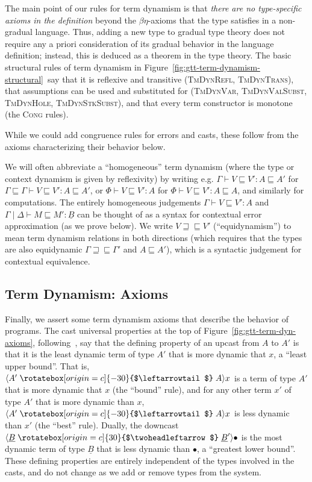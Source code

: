 \documentclass[acmsmall,screen,12pt]{acmart}
\newif\ifshort
\newif\iflong
\renewcommand{\u}{\underline}
\newcommand{\ltdyn}{\sqsubseteq}
\newcommand{\gtdyn}{\sqsupseteq}
\newcommand{\equidyn}{\mathrel{\gtdyn\ltdyn}}
\newcommand{\uarrow}{\mathrel{\rotatebox[origin=c]{-30}{$\leftarrowtail$}}}
\newcommand{\darrow}{\mathrel{\rotatebox[origin=c]{30}{$\twoheadleftarrow$}}}
\newcommand{\upcast}[2]{\langle{#2}\uarrow{#1}\rangle}
\newcommand{\dncast}[2]{\langle{#1}\darrow{#2}\rangle}
\begin{document}
The main point of our rules for term dynamism is that \emph{there are no
  type-specific axioms in the definition} beyond the $\beta\eta$-axioms
that the type satisfies in a non-gradual language.  Thus, adding a new
type to gradual type theory does not require any a priori consideration
of its gradual behavior in the language definition; instead, this is
deduced as a theorem in the type theory.  The basic structural rules of
term dynamism in Figure~\ref{fig:gtt-term-dynamism-structural}\iflong\ and Figure~\ref{fig:gtt-term-dynamism-ext-congruence}\fi\ say that
it is reflexive and transitive (\textsc{TmDynRefl},
\textsc{TmDynTrans}), that assumptions can be used and substituted for
(\textsc{TmDynVar}, \textsc{TmDynValSubst}, \textsc{TmDynHole},
\textsc{TmDynStkSubst}), and that every term constructor is monotone
(the \textsc{Cong} rules).
\begin{longonly}
While we could add congruence rules for errors and casts,
these follow from the axioms characterizing their behavior below.  
\end{longonly}

We will often abbreviate a ``homogeneous'' term dynamism (where the type
or context dynamism is given by reflexivity) by writing e.g. $\Gamma
\vdash V \ltdyn V' : A \ltdyn A'$ for $\Gamma \ltdyn \Gamma \vdash V
\ltdyn V' : A \ltdyn A'$, or $\Phi \vdash V \ltdyn V' : A$ for $\Phi
\vdash V \ltdyn V' : A \ltdyn A$, and similarly for computations.  The
entirely homogeneous judgements $\Gamma \vdash V \ltdyn V' : A$ and
$\Gamma \mid \Delta \vdash M \ltdyn M' : \u B$ can be thought of as a
syntax for contextual error approximation (as we prove below).  We write
$V \equidyn V'$ (``equidynamism'') to mean term dynamism relations in
both directions (which requires that the types are also equidynamic
$\Gamma \equidyn \Gamma'$ and $A \ltdyn A'$), which is a syntactic
judgement for contextual equivalence.

\ifshort \vspace{-0.1in} \fi
\subsection{Term Dynamism: Axioms}

Finally, we assert some term dynamism axioms that describe the behavior
of programs.  The cast universal properties at the top of
Figure~\ref{fig:gtt-term-dyn-axioms}, following~\citet{newlicata2018-fscd}, say that
the defining property of an upcast from $A$ to $A'$ is that it is the
least dynamic term of type $A'$ that is more dynamic that $x$, a ``least
upper bound''.  That is, $\upcast{A}{A'}{x}$ is a term of type $A'$ that
is more dynamic that $x$ (the ``bound'' rule), and for any other term
$x'$ of type $A'$ that is more dynamic than $x$, $\upcast{A}{A'}{x}$ is
less dynamic than $x'$ (the ``best'' rule). Dually, the downcast
$\dncast{\u B}{\u B'}{\bullet}$ is the most dynamic term of type $\u B$
that is less dynamic than $\bullet$, a ``greatest lower bound''.  These
defining properties are entirely independent of the types involved in
the casts, and do not change as we add or remove types from the system.
\end{document}
